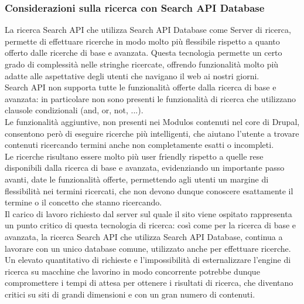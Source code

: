 			\subsubsection{Considerazioni sulla ricerca con Search API Database}
			La ricerca \gls{Search API} che utilizza \gls{Search API Database} come \gls{Server} di ricerca, permette di effettuare ricerche in modo molto più flessibile rispetto a quanto offerto dalle ricerche di base e avanzata.
			Questa tecnologia permette un certo grado di complessità nelle stringhe ricercate, offrendo funzionalità molto più adatte alle aspettative degli utenti che navigano il web ai nostri giorni. \\
			\gls{Search API} non supporta tutte le funzionalità offerte dalla ricerca di base e avanzata: in particolare non sono presenti le funzionalità di ricerca che utilizzano clausole condizionali (and, or, not, ...). \\
			Le funzionalità aggiuntive, non presenti nei \glspl{Modulo} contenuti nel core di \gls{Drupal}, consentono però di eseguire ricerche più intelligenti, che aiutano l'utente a trovare contenuti ricercando termini anche non completamente esatti o incompleti. \\
			Le ricerche risultano essere molto più user friendly rispetto a quelle rese disponibili dalla ricerca di base e avanzata, evidenziando un importante passo avanti, date le funzionalità offerte, permettendo agli utenti un margine di flessibilità nei termini ricercati, che non devono dunque conoscere esattamente il termine o il concetto che stanno ricercando. \\
			Il carico di lavoro richiesto dal server sul quale il sito viene ospitato rappresenta un punto critico di questa tecnologia di ricerca: così come per la ricerca di base e avanzata, la ricerca \gls{Search API} che utilizza \gls{Search API Database}, continua a lavorare con un unico database comune, utilizzato anche per effettuare ricerche. Un elevato quantitativo di richieste e l'impossibilità di esternalizzare l'engine di ricerca su macchine che lavorino in modo concorrente potrebbe dunque compromettere i tempi di attesa per ottenere i risultati di ricerca, che diventano critici su siti di grandi dimensioni e con un gran numero di contenuti.

